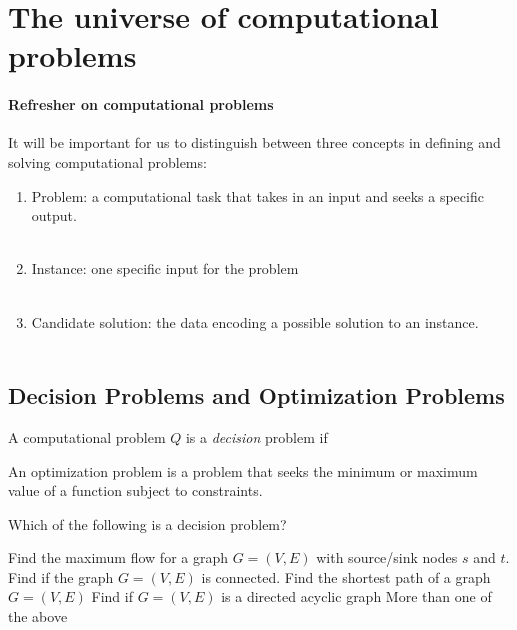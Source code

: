 \documentclass[11  pt]{article}
\begin{document}
	
	\section{The universe of computational problems}
	\vspace{5cm}
	

	
	\paragraph{Refresher on computational problems}
	It will be important for us to distinguish between three concepts in defining and solving computational problems:
	\begin{enumerate}
		\item Problem: a computational task that takes in an input and seeks a specific output. \\ \\
		\item Instance:  one specific input for the problem \\ \\
		\item Candidate solution: the data encoding a possible solution to an instance. \\ \\
	\end{enumerate}

	\newpage
	
	\subsection{Decision Problems and Optimization Problems}
	A computational problem $Q$ is a \emph{decision} problem if \\%
	
	
	\vfill
	
	An optimization problem is a problem that seeks the minimum or maximum value of a function subject to constraints. \\
	
		\begin{Qu}
		Which of the following is a decision problem?
		\begin{itemize}
			\aitem Find the maximum flow for a graph $G = (V,E)$ with source/sink nodes $s$ and $t$.
			\bitem Find if the graph $G = (V,E)$ is connected.
			\citem Find the shortest path of a graph $G = (V,E)$
			\ditem Find if $G = (V,E)$ is a directed acyclic graph
			\eitem More than one of the above
		\end{itemize}
	\end{Qu}
\end{document}
